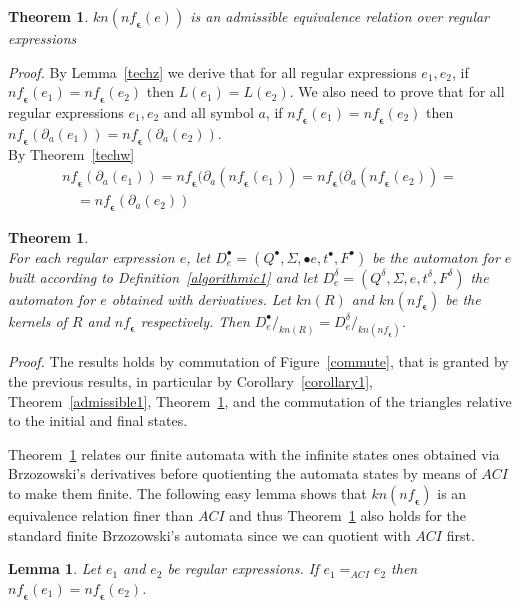 \documentclass[preprint]{sigplanconf}
\newcommand{\der}[2]{\ensuremath{\partial_{#1}(#2)}}
\newcommand{\nf}{\mathit{nf}_{\!\mathbf{\epsilon}}}
\newcounter{item}
\newtheorem{theorem}[item]{Theorem}
\newtheorem{lemma}[item]{Lemma}
\newenvironment{proof}{\begin{trivlist}\item[]{\em Proof.}}{\end{trivlist}}
\begin{document}
\begin{theorem}\label{admissible2}
$kn(\nf(e))$ is an admissible equivalence relation over regular
expressions
\end{theorem}
\begin{proof}
By Lemma~\ref{techz} we derive that for all regular expressions $e_1,e_2$,
if $\nf(e_1) = \nf(e_2)$ then $L(e_1) = L(e_2)$.
We also need to prove that for all regular expressions $e_1,e_2$
and all symbol $a$, if $\nf(e_1) = \nf(e_2)$ then
$\nf(\der{a}{e_1}) = \nf(\der{a}{e_2})$.\\ By Theorem~\ref{techw}
$$\begin{array}{l}
\nf(\der{a}{e_1}) =
\nf(\der{a}{\nf(e_1)}
= \nf(\der{a}{\nf(e_2)} =\\
\quad = \nf(\der{a}{e_2})
\end{array}
$$
\end{proof}

\begin{theorem}\label{thesame}~\\
For each regular expression $e$, let
$D_e^\bullet = (Q^\bullet,\Sigma,\bullet e,t^\bullet,F^\bullet)$
be the automaton
for $e$ built according to Definition~\ref{algorithmic1} and let
$D_e^\delta = (Q^\delta,\Sigma,e,t^\delta,F^\delta)$ the automaton for
$e$ obtained with derivatives. Let $kn(R)$ and $kn(\nf{})$ be the kernels of $R$
and $\nf{}$ respectively. Then
$D_e^\bullet/_{kn(R)} = D_e^\delta/_{kn(\nf{})}$.
\end{theorem}
\begin{proof}
The results holds by commutation of Figure~\ref{commute}, that is granted
by the previous results, in particular by Corollary~\ref{corollary1},
Theorem~\ref{admissible1}, Theorem~\ref{admissible2}, and the commutation
of the triangles relative to the initial and final states.
\end{proof}

Theorem~\ref{thesame} relates our finite automata with the infinite states ones
obtained via Brzozowski's derivatives before quotienting the automata states
by means of $ACI$ to make them finite. The following easy lemma shows that
$kn(\nf)$ is an equivalence relation finer than $ACI$ and thus
Theorem~\ref{thesame} also holds for the standard finite Brzozowski's automata
since we can quotient with $ACI$ first.
\begin{lemma}
Let $e_1$ and $e_2$ be regular expressions.
If $e_1 =_{ACI} e_2$ then $\nf(e_1) = \nf(e_2)$.
\end{lemma}
\end{document}
